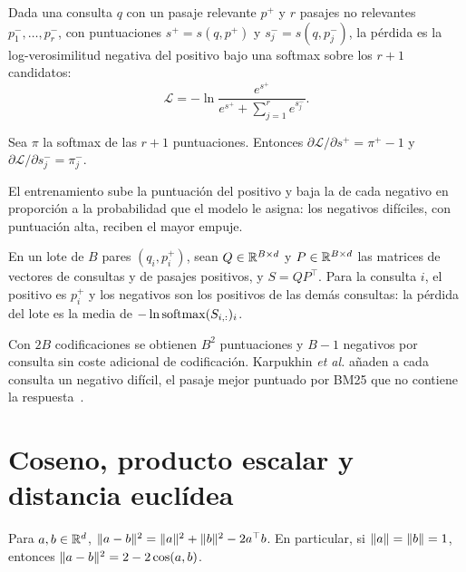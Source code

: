 \begin{definicion}\label{def:contrastiva}
Dada una consulta $q$ con un pasaje relevante $p^{+}$ y $r$ pasajes no relevantes $p^{-}_1,\dots,p^{-}_r$, con puntuaciones $s^{+}=s(q,p^{+})$ y $s^{-}_j=s(q,p^{-}_j)$, la pérdida es la log-verosimilitud negativa del positivo bajo una softmax sobre los $r+1$ candidatos:
\[
\mathcal{L}=-\ln\frac{e^{s^{+}}}{e^{s^{+}}+\sum_{j=1}^{r}e^{s^{-}_j}} .
\]
\end{definicion}

\begin{proposicion}\label{prop:grad-contrastiva}
Sea $\pi$ la softmax de las $r+1$ puntuaciones. Entonces $\partial\mathcal{L}/\partial s^{+}=\pi^{+}-1$ y $\partial\mathcal{L}/\partial s^{-}_j=\pi^{-}_j$.
\end{proposicion}

El entrenamiento sube la puntuación del positivo y baja la de cada negativo en proporción a la probabilidad que el modelo le asigna: los negativos difíciles, con puntuación alta, reciben el mayor empuje.

\addtocounter{definicion}{1}%

\begin{definicion}\label{def:inbatch}
En un lote de $B$ pares $(q_i,p_i^{+})$, sean $Q\in\mathbb{R}^{B\times d}$ y $P\in\mathbb{R}^{B\times d}$ las matrices de vectores de consultas y de pasajes positivos, y $S=QP^{\top}$. Para la consulta $i$, el positivo es $p_i^{+}$ y los negativos son los positivos de las demás consultas: la pérdida del lote es la media de $-\ln\operatorname{softmax}(S_{i,:})_i$.
\end{definicion}

Con $2B$ codificaciones se obtienen $B^{2}$ puntuaciones y $B-1$ negativos por consulta sin coste adicional de codificación. Karpukhin \emph{et al.} añaden a cada consulta un negativo difícil, el pasaje mejor puntuado por BM25 que no contiene la respuesta~\cite{dpr}.

\section{Coseno, producto escalar y distancia euclídea}

\begin{teorema}\label{teo:dist-coseno}
Para $a,b\in\mathbb{R}^{d}$, $\lVert a-b\rVert^{2}=\lVert a\rVert^{2}+\lVert b\rVert^{2}-2a^{\top}b$. En particular, si $\lVert a\rVert=\lVert b\rVert=1$, entonces $\lVert a-b\rVert^{2}=2-2\cos(a,b)$.
\end{teorema}

